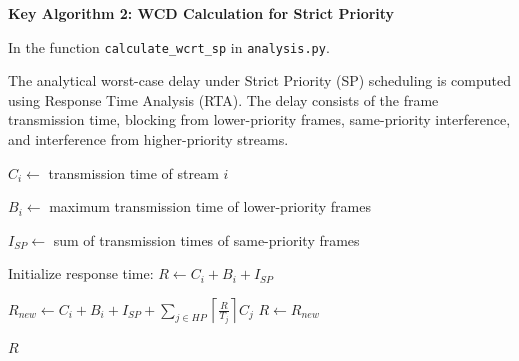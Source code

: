 \textbf{Key Algorithm 2: WCD Calculation for Strict Priority}

In the function \texttt{calculate\_wcrt\_sp} in \texttt{analysis.py}. 

The analytical worst-case delay under Strict Priority (SP) scheduling is computed using Response Time Analysis (RTA). The delay consists of the frame transmission time, blocking from lower-priority frames, same-priority interference, and interference from higher-priority streams.

\begin{algorithm}[H]
\caption{Worst-Case Delay Calculation for SP}
\begin{algorithmic}[1]

\State $C_i \leftarrow$ transmission time of stream $i$

\State $B_i \leftarrow$ maximum transmission time of lower-priority frames

\State $I_{SP} \leftarrow$ sum of transmission times of same-priority frames

\State Initialize response time:
\State $R \leftarrow C_i + B_i + I_{SP}$

\Repeat
\State $R_{new} \leftarrow C_i + B_i + I_{SP} + \sum_{j \in HP} \left\lceil \frac{R}{T_j} \right\rceil C_j$
\State $R \leftarrow R_{new}$

\State \Return $R$

\end{algorithmic}
\end{algorithm}
